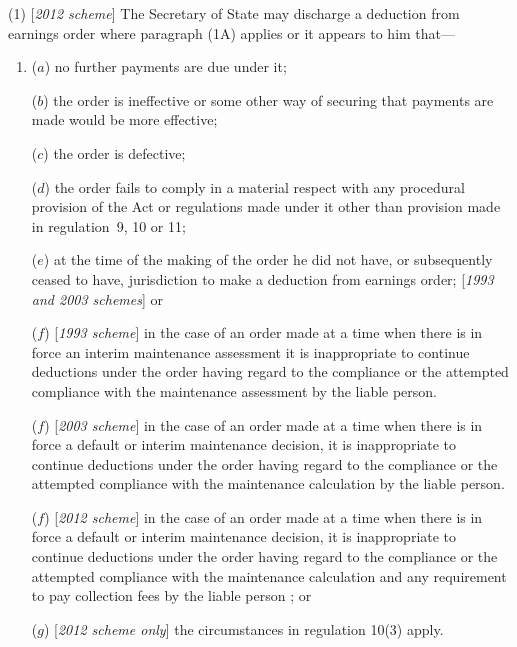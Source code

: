 \documentclass[12pt,a4paper]{article}
\begin{document}
(1) [\emph{2012 scheme}] The Secretary of State may discharge a deduction from earnings order where 
paragraph (1A) applies or  %
it appears to him that—
\begin{enumerate}\item[]
($a$) no further payments are due under it;

($b$) the order is ineffective or some other way of securing that payments are made would be more effective;

($c$) the order is defective;

($d$) the order fails to comply in a material respect with any procedural provision of the Act or regulations made under it other than provision made in regulation~9, 10 or 11;

($e$) at the time of the making of the order he did not have, or subsequently ceased to have, jurisdiction to make a deduction from earnings order; 
[\emph{1993 and 2003 schemes}] or  %

($f$) [\emph{1993 scheme}] in the case of an order made at a time when there is in force an interim maintenance assessment it is inappropriate to continue deductions under the order having regard to the compliance or the attempted compliance with the maintenance assessment by the liable person.

($f$) [\emph{2003 scheme}] in the case of an order made at a time when there is in force 
a default or interim maintenance decision,  %
it is inappropriate to continue deductions under the order having regard to the compliance or the attempted compliance with the 
maintenance calculation  %
by the liable person.

($f$) [\emph{2012 scheme}] in the case of an order made at a time when there is in force 
a default or interim maintenance decision,  %
it is inappropriate to continue deductions under the order having regard to the compliance or the attempted compliance with the 
maintenance calculation  %
and any requirement to pay collection fees  %
by the liable person%
; or

($g$) [\emph{2012 scheme only}] the circumstances in regulation 10(3) apply.
\end{enumerate}
\end{document}
